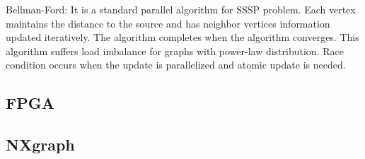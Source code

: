 Bellman-Ford: It is a standard parallel algorithm for SSSP problem. Each vertex
maintains the distance to the source and has neighbor vertices information
updated iteratively. The algorithm completes when the algorithm converges. 
This algorithm suffers load imbalance for graphs with power-law distribution.
Race condition occurs when the update is parallelized and atomic update is
needed.

\subsection{FPGA}

\subsection{NXgraph}


